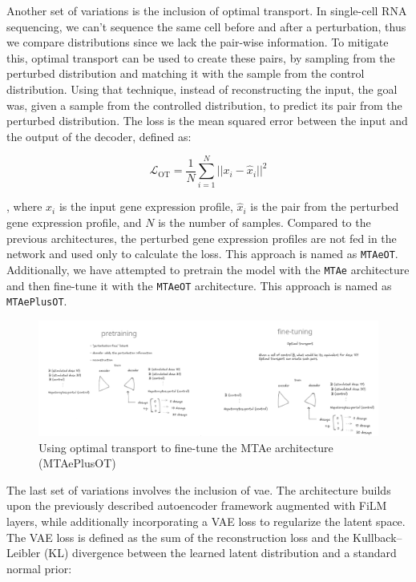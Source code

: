 \documentclass[12pt, a4paper]{article}
\begin{document}
Another set of variations is the inclusion of optimal transport. In single-cell RNA sequencing, we can't sequence the same cell before and after a perturbation, thus we compare distributions since we lack the pair-wise information. To mitigate this, optimal transport can be used to create these pairs, by sampling from the perturbed distribution and matching it with the sample from the control distribution. Using that technique, instead of reconstructing the input, the goal was, given a sample from the controlled distribution, to predict its pair from the perturbed distribution. The loss is the mean squared error between the input and the output of the decoder, defined as:

\[
\mathcal{L}_{\text{OT}} = \frac{1}{N} \sum_{i=1}^{N} ||x_i - \hat{x}_i||^2 
\]

, where $x_i$ is the input gene expression profile, $\hat{x}_i$ is the pair from the perturbed gene expression profile, and $N$ is the number of samples. Compared to the previous architectures, the perturbed gene expression profiles are not fed in the network and used only to calculate the loss. This approach is named as \verb|MTAeOT|. Additionally, we have attempted to pretrain the model with the \verb|MTAe| architecture and then fine-tune it with the \verb|MTAeOT| architecture. This approach is named as \verb|MTAePlusOT|.

\begin{figure}
    \centering
    \includegraphics[width=\textwidth]{ae_ot_sketch.png}
    \caption{Using optimal transport to fine-tune the MTAe architecture (MTAePlusOT)}
\end{figure}

The last set of variations involves the inclusion of \gls{vae}. The architecture builds upon the previously described autoencoder framework augmented with FiLM layers, while additionally incorporating a VAE loss to regularize the latent space. The VAE loss is defined as the sum of the reconstruction loss and the Kullback--Leibler (KL) divergence between the learned latent distribution and a standard normal prior:
\end{document}
